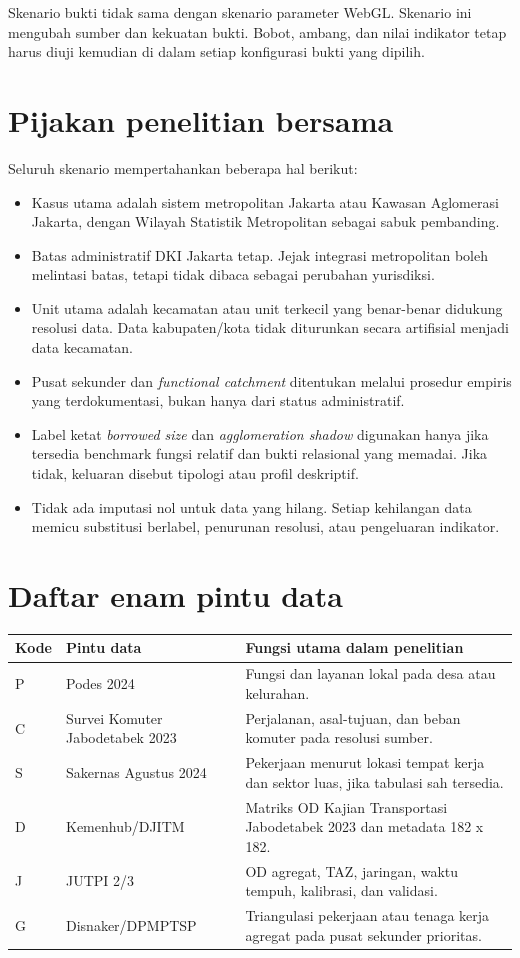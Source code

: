 \documentclass[11pt]{article}
\begin{document}
Skenario bukti tidak sama dengan skenario parameter WebGL. Skenario ini mengubah sumber dan kekuatan bukti. Bobot, ambang, dan nilai indikator tetap harus diuji kemudian di dalam setiap konfigurasi bukti yang dipilih.

\section*{Pijakan penelitian bersama}

Seluruh skenario mempertahankan beberapa hal berikut:
\begin{itemize}
  \item Kasus utama adalah sistem metropolitan Jakarta atau Kawasan Aglomerasi Jakarta, dengan Wilayah Statistik Metropolitan sebagai sabuk pembanding.
  \item Batas administratif DKI Jakarta tetap. Jejak integrasi metropolitan boleh melintasi batas, tetapi tidak dibaca sebagai perubahan yurisdiksi.
  \item Unit utama adalah kecamatan atau unit terkecil yang benar-benar didukung resolusi data. Data kabupaten/kota tidak diturunkan secara artifisial menjadi data kecamatan.
  \item Pusat sekunder dan \textit{functional catchment} ditentukan melalui prosedur empiris yang terdokumentasi, bukan hanya dari status administratif.
  \item Label ketat \textit{borrowed size} dan \textit{agglomeration shadow} digunakan hanya jika tersedia benchmark fungsi relatif dan bukti relasional yang memadai. Jika tidak, keluaran disebut tipologi atau profil deskriptif.
  \item Tidak ada imputasi nol untuk data yang hilang. Setiap kehilangan data memicu substitusi berlabel, penurunan resolusi, atau pengeluaran indikator.
\end{itemize}

\section*{Daftar enam pintu data}

\begin{tabularx}{\textwidth}{@{}P{0.08\textwidth}P{0.27\textwidth}Y@{}}
\toprule
Kode & Pintu data & Fungsi utama dalam penelitian \\
\midrule
P & Podes 2024 & Fungsi dan layanan lokal pada desa atau kelurahan. \\
C & Survei Komuter Jabodetabek 2023 & Perjalanan, asal-tujuan, dan beban komuter pada resolusi sumber. \\
S & Sakernas Agustus 2024 & Pekerjaan menurut lokasi tempat kerja dan sektor luas, jika tabulasi sah tersedia. \\
D & Kemenhub/DJITM & Matriks OD Kajian Transportasi Jabodetabek 2023 dan metadata 182 x 182. \\
J & JUTPI 2/3 & OD agregat, TAZ, jaringan, waktu tempuh, kalibrasi, dan validasi. \\
G & Disnaker/DPMPTSP & Triangulasi pekerjaan atau tenaga kerja agregat pada pusat sekunder prioritas. \\
\bottomrule
\end{tabularx}
\end{document}
